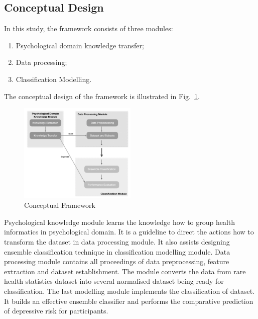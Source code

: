 \documentclass[10pt,journal,compsoc]{IEEEtran}
\begin{document}
\subsection{Conceptual Design}
In this study, the framework consists of three modules:
\begin{enumerate}
  \item Psychological domain knowledge transfer;
  \item Data processing;
  \item Classification Modelling.
\end{enumerate}
The conceptual design of the framework is illustrated in Fig.~\ref{fig1}.
\begin{figure}[h]
\centering
\captionsetup{justification=centering}
\includegraphics[width=0.5\textwidth]{concepts.png}
\caption{Conceptual Framework} \label{fig1}
\end{figure}
%
Psychological knowledge module learns the knowledge how to group health informatics in psychological domain. It is a guideline to direct the actions how to transform the dataset in data processing module. It also assists designing ensemble classification technique in classification modelling module. Data processing module contains all proceedings of data preprocessing, feature extraction and dataset establishment. The module converts the data from rare health statistics dataset into several normalised dataset being ready for classification. The last modelling module implements the classification of dataset. It builds an effective ensemble classifier and performs the comparative prediction of depressive risk for participants. 
%
%
%
\end{document}
